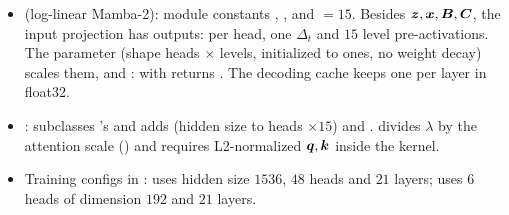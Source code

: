 \begin{implnote}[title={In the code: the model layers and their defaults}]
\begin{itemize}
\item {} (log-linear Mamba-2): module constants
  , ,
   and  $=15$.
  Besides $\bm{z},\bm{x},\bm{B},\bm{C}$, the input projection has 
  outputs: per head, one $\Delta_t$ and $15$ level pre-activations. The parameter  (shape heads $\times$ levels,
  initialized to ones, no weight decay) scales them, and
  :  with 
  returns . The decoding cache  keeps one
   per layer in float32.
\item {}:  subclasses
  \fla's  and adds  (hidden size to heads $\times 15$) and
  .  divides $\lambda$ by the attention
  scale () and requires L2-normalized $\bm{q},\bm{k}$ inside the kernel.
\item Training configs in :  uses hidden
  size $1536$, $48$ heads and $21$ layers;  uses $6$ heads of
  dimension $192$ and $21$ layers.
\end{itemize}
\end{implnote}


